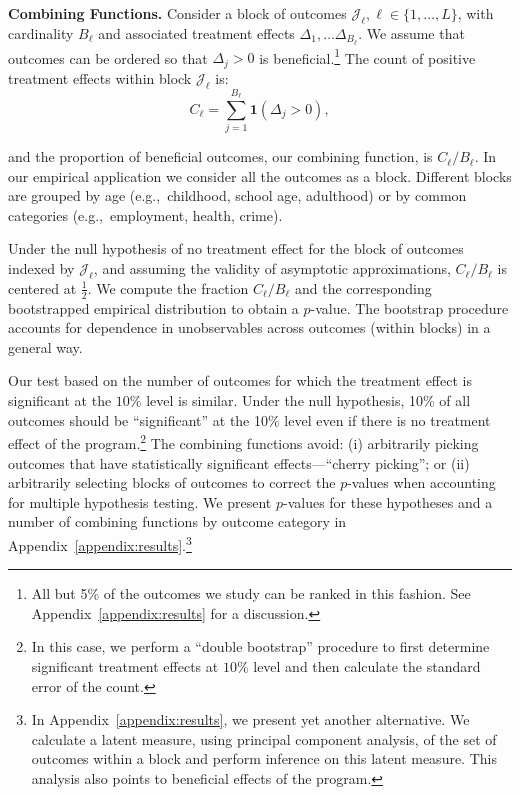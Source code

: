 \textbf{Combining Functions.} Consider a block of outcomes $\mathcal{J}_{\ell}, \ell \in \{1,\dots ,L\}$, with cardinality $B_{\ell}$ and  associated treatment effects $\Delta_1, \ldots \Delta_{B_\ell}$. We assume that outcomes can be ordered so that $\Delta_{j} >0$ is beneficial.\footnote{All but 5\% of the outcomes we study can be ranked in this fashion. See Appendix~\ref{appendix:results} for a discussion.} The count of positive treatment effects within block $\mathcal{J}_{\ell}$ is:
\begin{equation}
C_\ell = \sum^{B_\ell}_{j=1} \bm{1} (\Delta_{j} >0),
\end{equation}

\noindent and the proportion of beneficial outcomes, our combining function, is $C_\ell / B_\ell$. In our empirical application we consider all the outcomes as a block. Different blocks are grouped by age (e.g.,\ childhood, school age, adulthood) or by common categories (e.g.,\ employment, health, crime).

Under the null hypothesis of no treatment effect for the block of outcomes indexed by $\mathcal{J}_\ell$, and assuming the validity of asymptotic approximations, $C_\ell / B_\ell$ is centered at $\frac{1}{2}$. We compute the fraction $C_\ell / B_\ell$ and the corresponding bootstrapped empirical distribution to obtain a $p$-value. The bootstrap procedure accounts for dependence in unobservables across outcomes (within blocks) in a general way.

Our test based on the number of outcomes for which the treatment effect is significant at the $10\%$ level is similar. Under the null hypothesis, 10\% of all outcomes should be ``significant'' at the 10\% level even if there is no treatment effect of the program.\footnote{In this case, we perform a ``double bootstrap'' procedure to first determine significant treatment effects at $10\%$ level and then calculate the standard error of the count.} The combining functions avoid: (i) arbitrarily picking outcomes that have statistically significant effects---``cherry picking''; or (ii) arbitrarily selecting blocks of outcomes to correct the $p$-values when accounting for multiple hypothesis testing. We present $p$-values for these hypotheses and a number of combining functions by outcome category in Appendix~\ref{appendix:results}.\footnote{In Appendix~\ref{appendix:results}, we present yet another alternative. We calculate a latent measure, using principal component analysis, of the set of outcomes within a block and perform inference on this latent measure. This analysis also points to beneficial effects of the program.}

